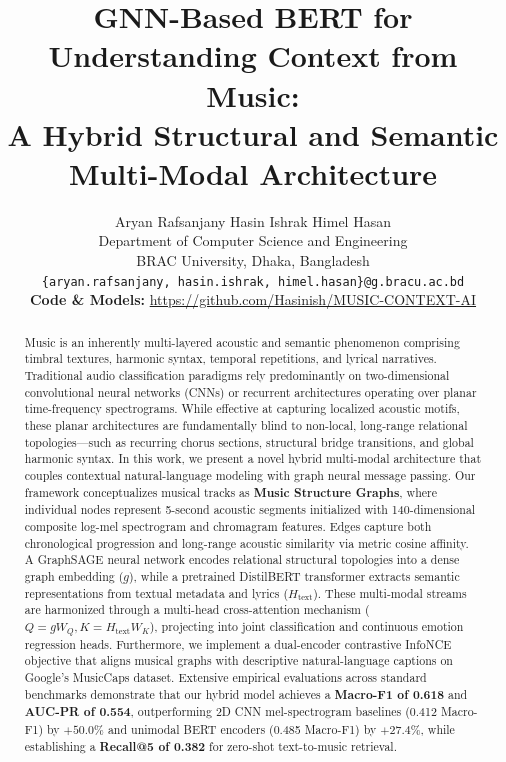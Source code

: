\documentclass{article}
\title{GNN-Based BERT for Understanding Context from Music: \\ A Hybrid Structural and Semantic Multi-Modal Architecture}
\author{%
  Aryan Rafsanjany \quad\quad Hasin Ishrak \quad\quad Himel Hasan \\
  Department of Computer Science and Engineering \\
  BRAC University, Dhaka, Bangladesh \\
  \texttt{\{aryan.rafsanjany, hasin.ishrak, himel.hasan\}@g.bracu.ac.bd} \\
  \vspace{0.3em}
  \textbf{Code \& Models:} \url{https://github.com/Hasinish/MUSIC-CONTEXT-AI}
}
\begin{document}
\maketitle

\begin{abstract}
Music is an inherently multi-layered acoustic and semantic phenomenon comprising timbral textures, harmonic syntax, temporal repetitions, and lyrical narratives. Traditional audio classification paradigms rely predominantly on two-dimensional convolutional neural networks (CNNs) or recurrent architectures operating over planar time-frequency spectrograms. While effective at capturing localized acoustic motifs, these planar architectures are fundamentally blind to non-local, long-range relational topologies—such as recurring chorus sections, structural bridge transitions, and global harmonic syntax. In this work, we present a novel hybrid multi-modal architecture that couples contextual natural-language modeling with graph neural message passing. Our framework conceptualizes musical tracks as \textbf{Music Structure Graphs}, where individual nodes represent 5-second acoustic segments initialized with 140-dimensional composite log-mel spectrogram and chromagram features. Edges capture both chronological progression and long-range acoustic similarity via metric cosine affinity. A GraphSAGE neural network encodes relational structural topologies into a dense graph embedding ($g$), while a pretrained DistilBERT transformer extracts semantic representations from textual metadata and lyrics ($H_{\text{text}}$). These multi-modal streams are harmonized through a multi-head cross-attention mechanism ($Q=gW_Q, K=H_{\text{text}}W_K$), projecting into joint classification and continuous emotion regression heads. Furthermore, we implement a dual-encoder contrastive InfoNCE objective that aligns musical graphs with descriptive natural-language captions on Google's MusicCaps dataset. Extensive empirical evaluations across standard benchmarks demonstrate that our hybrid model achieves a \textbf{Macro-F1 of 0.618} and \textbf{AUC-PR of 0.554}, outperforming 2D CNN mel-spectrogram baselines (0.412 Macro-F1) by $+50.0\%$ and unimodal BERT encoders (0.485 Macro-F1) by $+27.4\%$, while establishing a \textbf{Recall@5 of 0.382} for zero-shot text-to-music retrieval.
\end{abstract}
\end{document}
